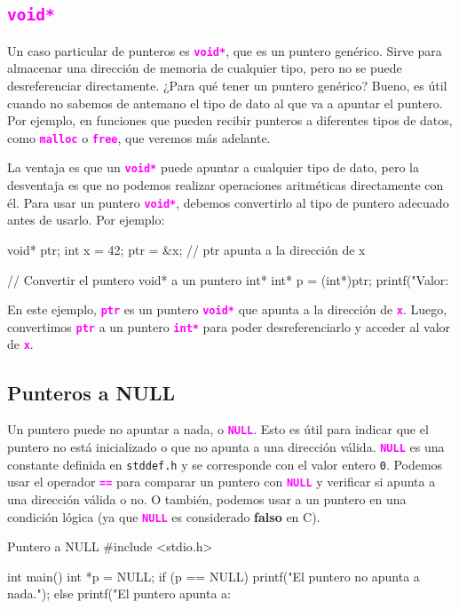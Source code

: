 \documentclass[]{scrartcl}
\newcommand{\hl}[1]{\textcolor{magenta}{\textbf{\texttt{#1}}}}
\begin{document}
\subsection*{\hl{void*}}

Un caso particular de punteros es \hl{void*}, que es un puntero genérico. Sirve para almacenar una dirección de memoria de cualquier tipo, pero no se puede desreferenciar directamente. 
¿Para qué tener un puntero genérico? Bueno, es útil cuando no sabemos de antemano el tipo de dato al que va a apuntar el puntero. Por ejemplo, en funciones que pueden recibir punteros a diferentes tipos de datos, como \hl{malloc} o \hl{free}, que veremos más adelante.

La ventaja es que un \hl{void*} puede apuntar a cualquier tipo de dato, pero la desventaja es que no podemos realizar operaciones aritméticas directamente con él. Para usar un puntero \hl{void*}, debemos convertirlo al tipo de puntero adecuado antes de usarlo. Por ejemplo:

\begin{cbox}[]{}
  void* ptr;
  int x = 42;
  ptr = &x; // ptr apunta a la dirección de x

  // Convertir el puntero void* a un puntero int*
  int* p = (int*)ptr;
  printf("Valor: %
\end{cbox}

En este ejemplo, \hl{ptr} es un puntero \hl{void*} que apunta a la dirección de \hl{x}. Luego, convertimos \hl{ptr} a un puntero \hl{int*} para poder desreferenciarlo y acceder al valor de \hl{x}.

\subsection*{Punteros a NULL}

Un puntero puede no apuntar a nada, o \hl{NULL}. Esto es útil para indicar que el puntero no está inicializado o que no apunta a una dirección válida. \hl{NULL} es una constante definida en \texttt{stddef.h} y se corresponde con el valor entero \texttt{0}.
Podemos usar el operador \hl{==} para comparar un puntero con \hl{NULL} y verificar si apunta a una dirección válida o no. O también, podemos usar a un puntero en una condición lógica (ya que \hl{NULL} es considerado \textbf{falso} en C).

\begin{cbox}[]{Puntero a NULL}
  #include <stdio.h>

  int main(){
      int *p = NULL;
      if (p == NULL) {
          printf("El puntero no apunta a nada.\n");
      } else {
          printf("El puntero apunta a: %
      }
  }
\end{cbox}
\end{document}
